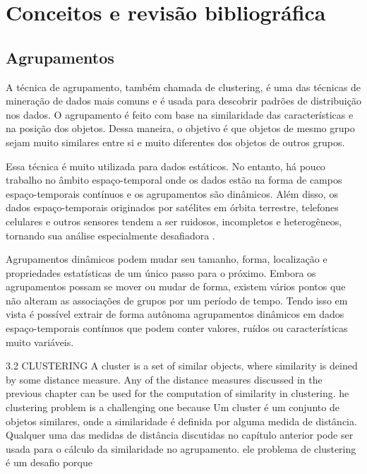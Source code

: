 \chapter{Conceitos e revisão bibliográfica}
\label{cap:estadodaarte}

\section{Agrupamentos}

A técnica de agrupamento, também chamada de clustering, é uma das técnicas de mineração de dados mais comuns e é usada para descobrir padrões de distribuição nos dados. O agrupamento é feito com base na similaridade das características e na posição dos objetos. Dessa maneira, o objetivo é que objetos de mesmo grupo sejam muito similares entre si e muito diferentes dos objetos de outros grupos.

Essa técnica é muito utilizada para dados estáticos. No entanto, há pouco trabalho no âmbito espaço-temporal onde os dados estão na forma de campos espaço-temporais contínuos e os agrupamentos são dinâmicos. Além disso, os dados espaço-temporais originados por satélites em órbita terrestre, telefones celulares e outros sensores tendem a ser ruidosos, incompletos e heterogêneos, tornando sua análise especialmente desafiadora \cite{faghmous2013}.

Agrupamentos dinâmicos podem mudar seu tamanho, forma, localização e propriedades estatísticas de um único passo para o próximo. Embora os agrupamentos possam se mover ou mudar de forma, existem vários pontos que não alteram as associações de grupos por um período de tempo. Tendo isso em vista é possível extrair de forma autônoma agrupamentos dinâmicos em dados espaço-temporais contínuos que podem conter valores, ruídos ou características muito variáveis.





3.2 CLUSTERING
A cluster is a set of similar objects, where similarity is deined by some distance measure. Any of the distance measures discussed in the previous chapter can be used for the computation of similarity in clustering. he clustering problem is a challenging one because
Um cluster é um conjunto de objetos similares, onde a similaridade é definida por alguma medida de distância. Qualquer uma das medidas de distância discutidas no capítulo anterior pode ser usada para o cálculo da similaridade no agrupamento. ele problema de clustering é um desafio porque

